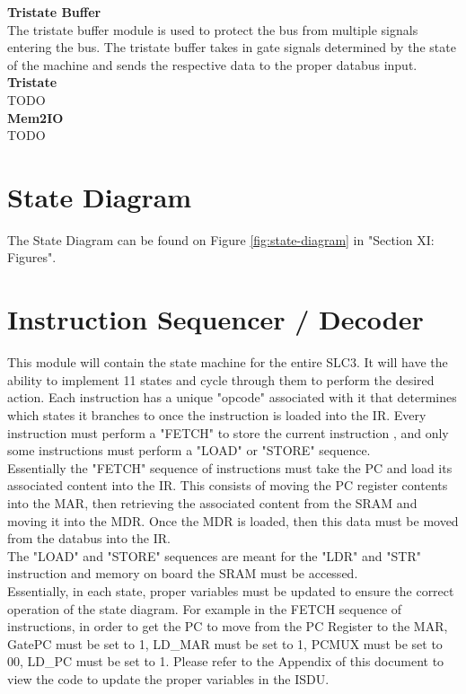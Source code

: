 \documentclass[journal, twocolumn, final,11pt,letterpaper]{IEEEtran}
\begin{document}
\normalsize\textbf{Tristate Buffer} \\

The tristate buffer module is used to protect the bus from multiple signals entering the bus.  The tristate buffer takes in gate signals determined by the state of the machine and sends the respective data to the proper databus input. \\

\normalsize\textbf{Tristate} \\
TODO \\

\normalsize\textbf{Mem2IO} \\
TODO \\

\section{State Diagram}
The State Diagram can be found on Figure \ref{fig:state-diagram} in "Section XI: Figures".

\section{Instruction Sequencer / Decoder}
This module will contain the state machine for the entire SLC3. It will have the ability to implement 11 states and cycle through them to perform the desired action. Each instruction has a unique "opcode" associated with it that determines which states it branches to once the instruction is loaded into the IR.  Every instruction must perform a "FETCH" to store the current instruction , and only some instructions must perform a "LOAD" or "STORE" sequence. \\

Essentially the "FETCH" sequence of instructions must take the PC and load its associated content into the IR. This consists of moving the PC register contents into the MAR, then retrieving the associated content from the SRAM and moving it into the MDR. Once the MDR is loaded, then this data must be moved from the databus into the IR. \\

The "LOAD" and "STORE" sequences are meant for the "LDR" and "STR" instruction and memory on board the SRAM must be accessed. \\

Essentially, in each state, proper variables must be updated to ensure the correct operation of the state diagram. For example in the FETCH sequence of instructions, in order to get the PC to move from the PC Register to the MAR, GatePC must be set to 1, LD\_MAR must be set to 1, PCMUX must be set to 00, LD\_PC must be set to 1. Please refer to the Appendix of this document to view the code to update the proper variables in the ISDU. 
\end{document}
